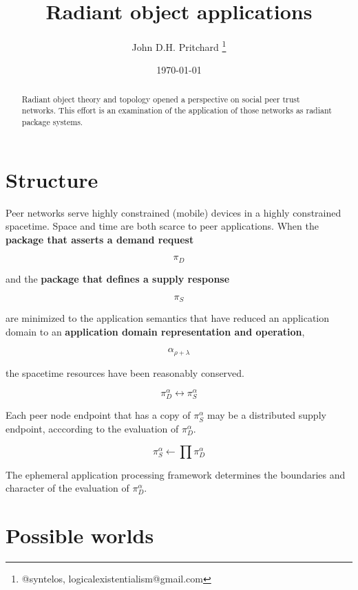 \documentclass[12pt,twocolumn]{article}
\begin{document}
\title{Radiant object applications}

\author{John D.H. Pritchard \thanks{@syntelos, logicalexistentialism@gmail.com}}

\date{\today}

\maketitle


\begin{abstract}

Radiant object theory \cite{ROTI} and topology \cite{ROTY} opened a
perspective on social peer trust networks.  This effort is an
examination of the application of those networks as radiant package
\cite{RFC5050} systems.
  
\end{abstract}


\section{Structure}

Peer networks serve highly constrained (mobile) devices in a highly
constrained spacetime.  Space and time are both scarce to peer
applications.  When the {\bf package that asserts a demand request}

$$
 \pi_D
$$

and the {\bf package that defines a supply response}

$$
 \pi_S
$$

are minimized to the application semantics that have reduced an
application domain to an {\bf application domain representation and
  operation},

$$
 \alpha_{\rho + \lambda}
$$

the spacetime resources have been reasonably conserved.

$$
 \pi^{\alpha}_{D} \longleftrightarrow \pi^{\alpha}_{S}
$$

Each peer node endpoint that has a copy of \(\pi^{\alpha}_{S}\) may be
a distributed supply endpoint, acccording to the evaluation of
\(\pi^{\alpha}_{D}\).

$$
 \pi^{\alpha}_S \leftarrow \prod \pi^{\alpha}_{D}
$$

The ephemeral application processing framework determines the
boundaries and character of the evaluation of \(\pi^{\alpha}_{D}\).

\section{Possible worlds}
\end{document}
